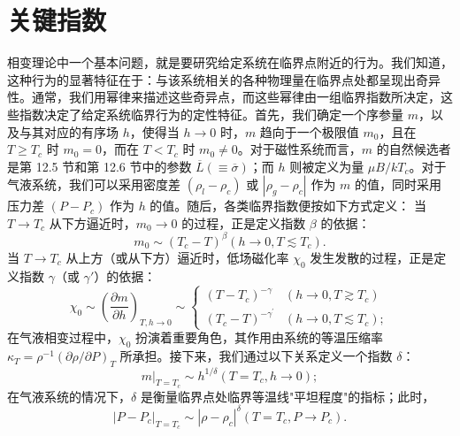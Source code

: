 \section{关键指数}\label{ux5173ux952eux6307ux6570}
相变理论中一个基本问题，就是要研究给定系统在临界点附近的行为。我们知道，这种行为的显著特征在于：与该系统相关的各种物理量在临界点处都呈现出奇异性。通常，我们用幂律来描述这些奇异点，而这些幂律由一组临界指数所决定，这些指数决定了给定系统临界行为的定性特征。首先，我们确定一个序参量 \(m\)，以及与其对应的有序场 \(h\)，使得当 \(h \to 0\) 时，\(m\) 趋向于一个极限值 \(m_0\)，且在 \(T \geq T_c\) 时 \(m_0 = 0\)，而在 \(T < T_c\) 时 \(m_0 \neq 0\)。对于磁性系统而言，\(m\) 的自然候选者是第 12.5 节和第 12.6 节中的参数 \(\overline{L} (\equiv \overline{\sigma})\)；而 \(h\) 则被定义为量 \(\mu B / kT_c\)。对于气液系统，我们可以采用密度差 \((\rho_l - \rho_c)\) 或 \(|\rho_g - \rho_c|\) 作为 \(m\) 的值，同时采用压力差 \((P - P_c)\) 作为 \(h\) 的值。随后，各类临界指数便按如下方式定义：
当 \(T \to T_{c}\) 从下方逼近时，\(m_{0} \to 0\) 的过程，正是定义指数 \(\beta\) 的依据：
\begin{equation}\tag{12.7.1}\label{eq:12.7.1}
m _ { 0 } \sim ( T _ { c } - T ) ^{\beta}  ( h \to 0 , T \lesssim T _ { c } ) .
\end{equation}
当 \(T \to T_{c}\) 从上方（或从下方）逼近时，低场磁化率 \(\chi_{0}\) 发生发散的过程，正是定义指数 \(\gamma\)（或 \(\gamma'\)）的依据：
\begin{equation}\tag{12.7.2}\label{eq:12.7.2}
\chi _ { 0 } \sim \left( \frac { \partial m } { \partial h } \right) _ { T , h \rightarrow 0 } \sim \left\{ \begin{array}{ll} { ( T - T _ { c } ) ^{- \gamma} } & { ( h \rightarrow 0 , T \gtrsim T _ { c } ) } \\{ ( T _ { c } - T ) ^{- \gamma ^ { \prime} } } & { ( h \rightarrow 0 , T \lesssim T _ { c } ) ; } \end{array} \right.
\end{equation}
在气液相变过程中，\(\chi_{0}\) 扮演着重要角色，其作用由系统的等温压缩率 \(\kappa_{T} = \rho^{-1}(\partial\rho/\partial P)_{T}\) 所承担。接下来，我们通过以下关系定义一个指数 \(\delta\)：
\begin{equation}\tag{12.7.3}\label{eq:12.7.3}
m | _ { T = T _ { c } } \sim h ^{1 / \delta}  ( T = T _ { c } , h \rightarrow 0 ) ;
\end{equation}
在气液系统的情况下，\(\delta\) 是衡量临界点处临界等温线"平坦程度"的指标；此时，
\begin{equation}\tag{12.7.4}\label{eq:12.7.4}
\left| P - P _ { c } \right| _ { T = T _ { c } } \sim \left| \rho - \rho _ { c } \right| ^{\delta}  ( T = T _ { c } , P \rightarrow P _ { c } ) .
\end{equation}
